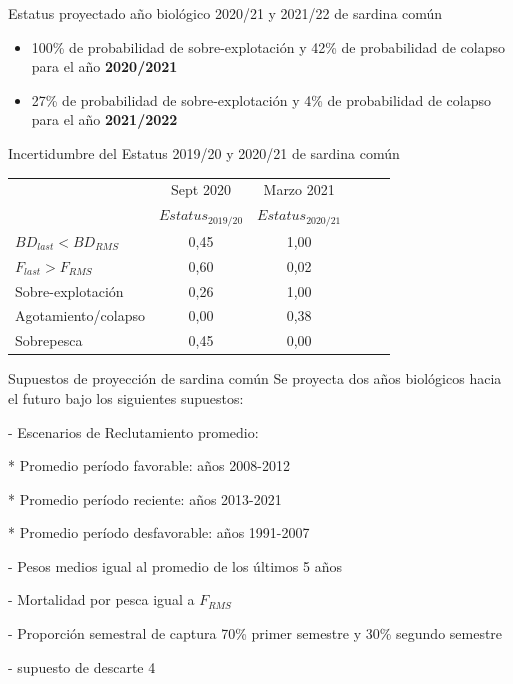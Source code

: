 \documentclass[
  ignorenonframetext,
]{beamer}
\begin{document}
\begin{frame}{Estatus proyectado año biológico 2020/21 y 2021/22 de
sardina común}
\footnotesize

\begin{itemize}
\item
  100\% de probabilidad de sobre-explotación y 42\% de probabilidad de
  colapso para el año \textbf{2020/2021}
\item
  27\% de probabilidad de sobre-explotación y 4\% de probabilidad de
  colapso para el año \textbf{2021/2022}
\end{itemize}
\end{frame}

\begin{frame}{Incertidumbre del Estatus 2019/20 y 2020/21 de sardina
común}
\protect\hypertarget{incertidumbre-del-estatus-201920-y-202021-de-sardina-comuxfan}{}
\begin{table}
    \centering
    \resizebox{10cm}{!} {
    \begin{tabular}{|l|c|c|c|c|c|}
    \hline
                            & Sept 2020 & Marzo 2021 \\
                            & $Estatus_{2019/20}$ & $Estatus_{2020/21}$ \\ \hline
   $BD_{last}<BD_{RMS}$     &   0,45    & 1,00 \\
   $F_{last}>F_{RMS}$       &   0,60    & 0,02 \\ \hline
   Sobre-explotación        &   0,26    & 1,00 \\
   Agotamiento/colapso      &   0,00    & 0,38 \\
   Sobrepesca               &   0,45    & 0,00 \\ \hline
    \end{tabular}}
    \end{table}
\end{frame}

\begin{frame}{Supuestos de proyección de sardina común}
\protect\hypertarget{supuestos-de-proyecciuxf3n-de-sardina-comuxfan}{}
\small
Se proyecta dos años biológicos hacia el futuro bajo los siguientes supuestos:

-   Escenarios de Reclutamiento promedio:

    * Promedio período favorable: años 2008-2012
    
    * Promedio período reciente: años 2013-2021
    
    * Promedio período desfavorable: años 1991-2007

-   Pesos medios igual al promedio de los últimos 5 años

-   Mortalidad por pesca igual a $F_{RMS}$

-   Proporción semestral de captura 70\% primer semestre y 30\% segundo semestre

-   supuesto de descarte 4%
\end{frame}
\end{document}
